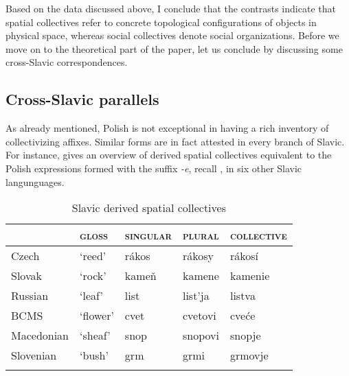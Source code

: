 \documentclass[output=paper]{langscibook}
\begin{document}
\ea\label{wan:ex:among}
\label{wan:ex:among-social} %
\label{wan:ex:among-spatial}
\z
\z

\noindent Based on the data discussed above, I conclude that the contrasts indicate that spatial collectives refer to concrete topological configurations of objects in physical space, whereas social collectives denote social organizations. Before we move on to the theoretical part of the paper, let us conclude by discussing some cross-Slavic correspondences.

\subsection{Cross-Slavic parallels}\label{wan:sec:cross-slavic-parallels}

As already mentioned, Polish is not exceptional in having a rich inventory of collectivizing affixes. Similar forms are in fact attested in every branch of Slavic. For instance,  gives an overview of derived spatial collectives equivalent to the Polish expressions formed with the suffix \textit{-e}, recall , in six other Slavic langunguages.

\begin{table}[h!]
\caption{Slavic derived spatial collectives} 
\label{wan:tab:slavic-derived-spatial-collectives}
 \begin{tabular}{lllll} 
  \lsptoprule
    & \textsc{gloss}        & \textsc{singular} & \textsc{plural} & \textsc{collective} \\ 
  \midrule
  Czech & `reed'  &   rákos &   rákosy &    rákosí \\
  Slovak & `rock'  &   kameň &   kamene &    kamenie \\
  Russian & `leaf'  &   list &    list'ja  &    listva \\
  BCMS & `flower'  &   cvet &   cvetovi &    cveće \\
  Macedonian & `sheaf' & snop & snopovi & snopje \\
  Slovenian & `bush'  &   grm &   grmi &    grmovje \\
  \lspbottomrule
 \end{tabular}
\end{table}
\end{document}
